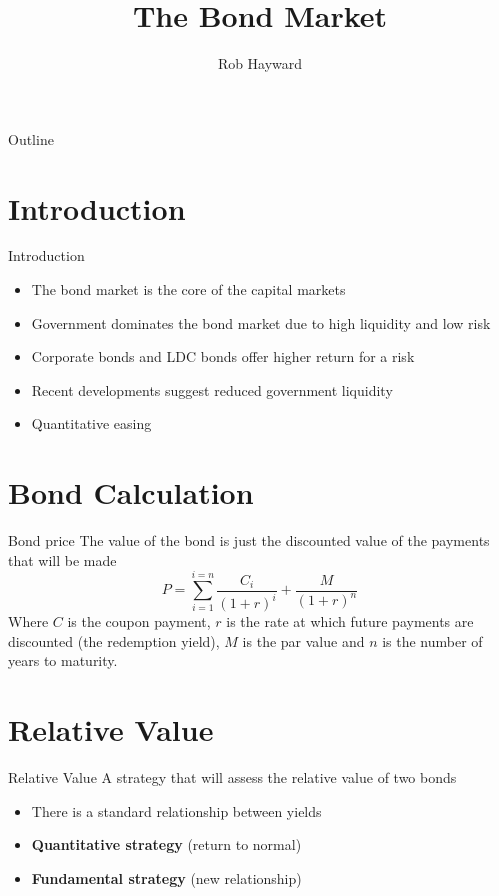 \documentclass[14pt,xcolor=pdftex,dvipsnames,table]{beamer}\usepackage[]{graphicx}\usepackage[]{color}
\title{The Bond Market}
\author{Rob Hayward}
\begin{document}
\begin{frame}
\titlepage
\end{frame}


\begin{frame}{Outline}
\tableofcontents
\end{frame}


\section{Introduction}
\begin{frame}{Introduction}
\begin{itemize}[<+-| alert@+>]
\item The bond market is the core of the capital markets
\item Government dominates the bond market due to high liquidity and low risk
\item Corporate bonds and LDC bonds offer higher return for a risk
\item Recent developments suggest reduced government liquidity
\item Quantitative easing 
\end{itemize}
\end{frame}



\section{Bond Calculation}
\begin{frame}{Bond price}
The value of the bond is just the discounted value of the payments that will be made
\begin{equation*}
P = \sum_{i = 1}^{i = n} \frac{C_i}{(1+r)^i} + \frac{M}{(1+r)^n}
\end{equation*}
Where $C$ is the coupon payment, $r$ is the rate at which future payments are discounted (the redemption yield), $M$ is the par value and $n$ is the number of years to maturity. 
\end{frame}

\section{Relative Value}
\begin{frame}{Relative Value}
A strategy that will assess the relative value of two bonds
\begin{itemize}[<+-| alert@+>]
\item There is a standard relationship between yields
\item \textbf{Quantitative strategy} (return to normal)
\item \textbf{Fundamental strategy} (new relationship)
\end{itemize}
\end{frame}
\end{document}
